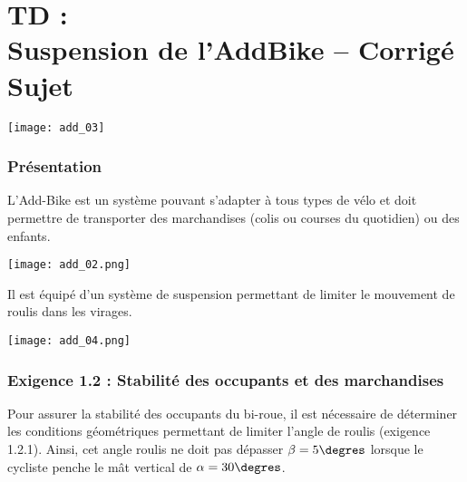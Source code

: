 \chapter*{TD  :\\ 
Suspension de l'AddBike -- \ifprof Corrigé \else Sujet \fi}

\iflivret {} \else
\ifprof  {} \else \fi
\fi

\setcounter{question}{0}

\begin{marginfigure}
\texttt{[image: add\_03]}
\end{marginfigure}


\subsection*{Présentation}
L'Add-Bike est un système pouvant s’adapter à tous types de vélo et doit permettre de transporter des marchandises (colis ou courses du quotidien) ou des enfants.
\begin{marginfigure}
\texttt{[image: add\_02.png]}
\end{marginfigure}
Il est équipé d'un système de suspension permettant de limiter le mouvement de roulis dans les virages. 

\begin{center}
\texttt{[image: add\_04.png]}
\end{center}

\subsection*{Exigence 1.2 : Stabilité des occupants et des marchandises}

\begin{obj}
Pour assurer la stabilité des occupants du bi-roue, il est nécessaire de déterminer les conditions géométriques permettant de limiter l’angle de roulis (exigence 1.2.1). Ainsi, cet angle roulis ne doit pas dépasser $\beta=5\degres$  lorsque le cycliste  penche le mât vertical de $\alpha=30\degres$.
\end{obj}

